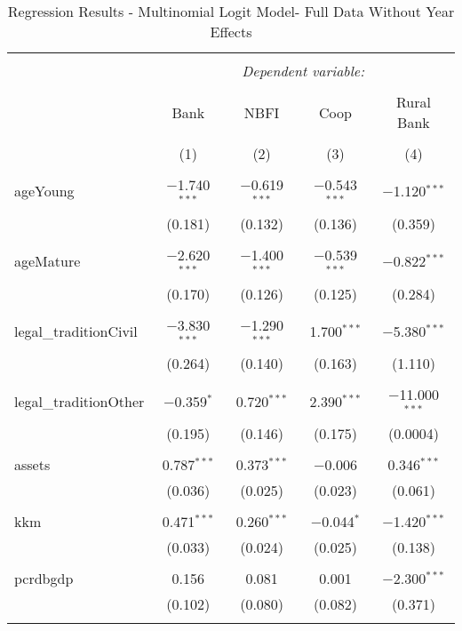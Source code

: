 \documentclass[a4paper,nobind]{templates/ociamthesis}
\begin{document}
\begin{table}[!htbp] \centering 
  \caption{Regression Results - Multinomial Logit Model- Full Data Without Year Effects} 
  \label{} 
\footnotesize 
\begin{tabular}{@{\extracolsep{5pt}}lcccc} 
\\[-1.8ex]\hline 
\hline \\[-1.8ex] 
 & \multicolumn{4}{c}{\textit{Dependent variable:}} \\ 
\cline{2-5} 
\\[-1.8ex] & Bank & NBFI & Coop & Rural Bank \\ 
\\[-1.8ex] & (1) & (2) & (3) & (4)\\ 
\hline \\[-1.8ex] 
 ageYoung & $-$1.740$^{***}$ & $-$0.619$^{***}$ & $-$0.543$^{***}$ & $-$1.120$^{***}$ \\ 
  & (0.181) & (0.132) & (0.136) & (0.359) \\ 
  & & & & \\ 
 ageMature & $-$2.620$^{***}$ & $-$1.400$^{***}$ & $-$0.539$^{***}$ & $-$0.822$^{***}$ \\ 
  & (0.170) & (0.126) & (0.125) & (0.284) \\ 
  & & & & \\ 
 legal\_traditionCivil & $-$3.830$^{***}$ & $-$1.290$^{***}$ & 1.700$^{***}$ & $-$5.380$^{***}$ \\ 
  & (0.264) & (0.140) & (0.163) & (1.110) \\ 
  & & & & \\ 
 legal\_traditionOther & $-$0.359$^{*}$ & 0.720$^{***}$ & 2.390$^{***}$ & $-$11.000$^{***}$ \\ 
  & (0.195) & (0.146) & (0.175) & (0.0004) \\ 
  & & & & \\ 
 assets & 0.787$^{***}$ & 0.373$^{***}$ & $-$0.006 & 0.346$^{***}$ \\ 
  & (0.036) & (0.025) & (0.023) & (0.061) \\ 
  & & & & \\ 
 kkm & 0.471$^{***}$ & 0.260$^{***}$ & $-$0.044$^{*}$ & $-$1.420$^{***}$ \\ 
  & (0.033) & (0.024) & (0.025) & (0.138) \\ 
  & & & & \\ 
 pcrdbgdp & 0.156 & 0.081 & 0.001 & $-$2.300$^{***}$ \\ 
  & (0.102) & (0.080) & (0.082) & (0.371) \\ 
  & & & & \\ 

\end{tabular}
\end{table}
\end{document}
